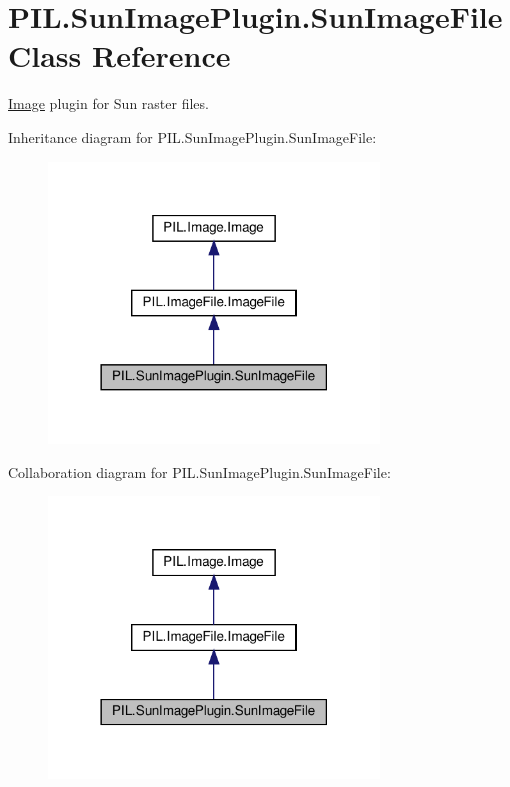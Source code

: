 \hypertarget{classPIL_1_1SunImagePlugin_1_1SunImageFile}{}\section{P\+I\+L.\+Sun\+Image\+Plugin.\+Sun\+Image\+File Class Reference}
\label{classPIL_1_1SunImagePlugin_1_1SunImageFile}


\hyperlink{namespacePIL_1_1Image}{Image} plugin for Sun raster files.  




Inheritance diagram for P\+I\+L.\+Sun\+Image\+Plugin.\+Sun\+Image\+File\+:
\nopagebreak
\begin{figure}[H]
\begin{center}
\leavevmode
\includegraphics[width=249pt]{classPIL_1_1SunImagePlugin_1_1SunImageFile__inherit__graph}
\end{center}
\end{figure}


Collaboration diagram for P\+I\+L.\+Sun\+Image\+Plugin.\+Sun\+Image\+File\+:
\nopagebreak
\begin{figure}[H]
\begin{center}
\leavevmode
\includegraphics[width=249pt]{classPIL_1_1SunImagePlugin_1_1SunImageFile__coll__graph}
\end{center}
\end{figure}
